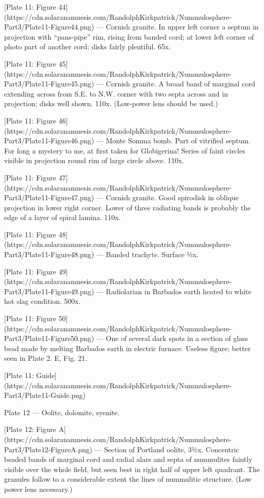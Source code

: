 \documentclass[a4paper, 12pt, oneside]{article}
\begin{document}
[Plate 11: Figure 44](https://cdn.solaranamnesis.com/RandolphKirkpatrick/Nummulosphere-Part3/Plate11-Figure44.png) --- Cornish granite. In upper left corner a septum in projection with ``pans-pipe'' rim, rising from banded cord; at lower left corner of photo part of another cord; disks fairly plentiful. 65x.

[Plate 11: Figure 45](https://cdn.solaranamnesis.com/RandolphKirkpatrick/Nummulosphere-Part3/Plate11-Figure45.png) --- Cornish granite. A broad band of marginal cord extending across from S.E. to N.W. corner with two septa across and in projection; disks well shown. 110x. (Low-power lens should be used.)

[Plate 11: Figure 46](https://cdn.solaranamnesis.com/RandolphKirkpatrick/Nummulosphere-Part3/Plate11-Figure46.png) --- Monte Somma bomb. Part of vitrified septum. For long a mystery to me, at first taken for Globigerina! Series of faint circles visible in projection round rim of large circle above. 110x.

[Plate 11: Figure 47](https://cdn.solaranamnesis.com/RandolphKirkpatrick/Nummulosphere-Part3/Plate11-Figure47.png) --- Cornish granite. Good spirodisk in oblique projection in lower right corner. Lower of three radiating bands is probably the edge of a layer of spiral lamina. 110x.

[Plate 11: Figure 48](https://cdn.solaranamnesis.com/RandolphKirkpatrick/Nummulosphere-Part3/Plate11-Figure48.png) --- Banded trachyte. Surface ½x.

[Plate 11: Figure 49](https://cdn.solaranamnesis.com/RandolphKirkpatrick/Nummulosphere-Part3/Plate11-Figure49.png) --- Radiolarian in Barbados earth heated to white hot slag condition. 500x.

[Plate 11: Figure 50](https://cdn.solaranamnesis.com/RandolphKirkpatrick/Nummulosphere-Part3/Plate11-Figure50.png) --- One of several dark spots in a section of glass bead made by melting Barbados earth in electric furnace. Useless figure; better seen in Plate 2. E, Fig. 21.

[Plate 11: Guide](https://cdn.solaranamnesis.com/RandolphKirkpatrick/Nummulosphere-Part3/Plate11-Guide.png)

Plate 12 --- Oolite, dolomite, syenite.

[Plate 12: Figure A](https://cdn.solaranamnesis.com/RandolphKirkpatrick/Nummulosphere-Part3/Plate12-FigureA.png) --- Section of Portland oolite, 3½x. Concentric beaded bands of marginal cord and radial alars and septa of nummulites faintly visible over the whole field, but seen best in right half of upper left quadrant. The granules follow to a considerable extent the lines of nummulitic structure. (Low power lens necessary.)
\end{document}
